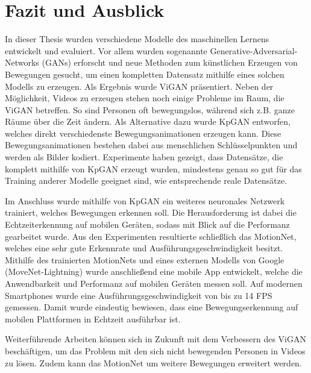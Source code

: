 \chapter{Fazit und Ausblick}
In dieser Thesis wurden verschiedene Modelle des maschinellen Lernens entwickelt und evaluiert. Vor allem wurden sogenannte Generative-Adversarial-Networks (GANs) erforscht und neue Methoden zum künstlichen Erzeugen von Bewegungen gesucht, um einen kompletten Datensatz mithilfe eines solchen Modells zu erzeugen. Als Ergebnis wurde ViGAN präsentiert. Neben der Möglichkeit, Videos zu erzeugen stehen noch einige Probleme im Raum, die ViGAN betreffen. So sind Personen oft bewegungslos, während sich z.B. ganze Räume über die Zeit ändern. Als Alternative dazu wurde KpGAN entworfen, welches direkt verschiedenste Bewegungsanimationen erzeugen kann. Diese Bewegungsanimationen bestehen dabei aus menschlichen Schlüsselpunkten und werden als Bilder kodiert. Experimente haben gezeigt, dass Datensätze, die komplett mithilfe von KpGAN erzeugt wurden, mindestens genau so gut für das Training anderer Modelle geeignet sind, wie entsprechende reale Datensätze.

Im Anschluss wurde mithilfe von KpGAN ein weiteres neuronales Netzwerk trainiert, welches Bewegungen erkennen soll. Die Herausforderung ist dabei die Echtzeiterkennung auf mobilen Geräten, sodass mit Blick auf die Performanz gearbeitet wurde. Aus den Experimenten resultierte schließlich das MotionNet, welches eine sehr gute Erkennrate und Ausführungsgeschwindigkeit besitzt. Mithilfe des trainierten MotionNets und eines externen Modells von Google (MoveNet-Lightning) wurde anschließend eine mobile App entwickelt, welche die Anwendbarkeit und Performanz auf mobilen Geräten messen soll. Auf modernen Smartphones wurde eine Ausführungsgeschwindigkeit von bis zu 14 FPS gemessen. Damit wurde eindeutig bewiesen, dass eine Bewegungserkennung auf mobilen Plattformen in Echtzeit ausführbar ist.

Weiterführende Arbeiten können sich in Zukunft mit dem Verbessern des ViGAN be\-schäf\-tigen, um das Problem mit den sich nicht bewegenden Personen in Videos zu lösen. Zudem kann das MotionNet um weitere Bewegungen erweitert werden.